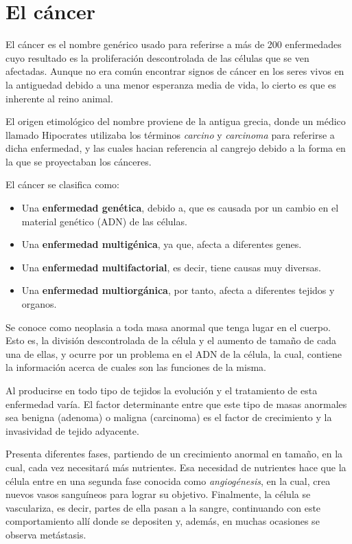 \section{El cáncer}

El cáncer es el nombre genérico usado para referirse a más de 200 enfermedades cuyo resultado
es la proliferación descontrolada de las células que se ven afectadas. Aunque no era común
encontrar signos de cáncer en los seres vivos en la antiguedad debido a una menor esperanza
media de vida, lo cierto es que es inherente al reino animal.

El origen etimológico del nombre proviene de la antigua grecia, donde un médico llamado
Hipocrates utilizaba los términos \textit{carcino} y \textit{carcinoma} para referirse
a dicha enfermedad, y las cuales hacian referencia al cangrejo debido a la forma en la
que se proyectaban los cánceres.

El cáncer se clasifica como:

\begin{itemize}
    \item Una \textbf{enfermedad genética}, debido a, que es causada por un cambio en el
    material genético (ADN) de las células.
    \item Una \textbf{enfermedad multigénica}, ya que, afecta a diferentes genes.
    \item Una \textbf{enfermedad multifactorial}, es decir, tiene causas muy diversas.
    \item Una \textbf{enfermedad multiorgánica}, por tanto, afecta a diferentes tejidos y organos.
\end{itemize}

Se conoce como neoplasia a toda masa anormal que tenga lugar en el cuerpo. Esto es, la división
descontrolada de la célula y el aumento de tamaño de cada una de ellas, y ocurre
por un problema en el ADN de la célula, la cual, contiene la información acerca de cuales son
las funciones de la misma.

Al producirse en todo tipo de tejidos la evolución y el tratamiento de esta enfermedad varía.
El factor determinante entre que este tipo de masas anormales sea benigna (adenoma)
o maligna (carcinoma) es el factor de crecimiento y la invasividad de tejido adyacente.

Presenta diferentes fases, partiendo de un crecimiento anormal en tamaño, en la cual,
cada vez necesitará más nutrientes. Esa necesidad de nutrientes hace que la célula entre en
una segunda fase conocida como \textit{angiogénesis}, en la cual, crea nuevos vasos sanguíneos
para lograr su objetivo. Finalmente, la célula se vasculariza, es decir, partes de ella pasan
a la sangre, continuando con este comportamiento allí donde se depositen y, además, en muchas
ocasiones se observa metástasis.

